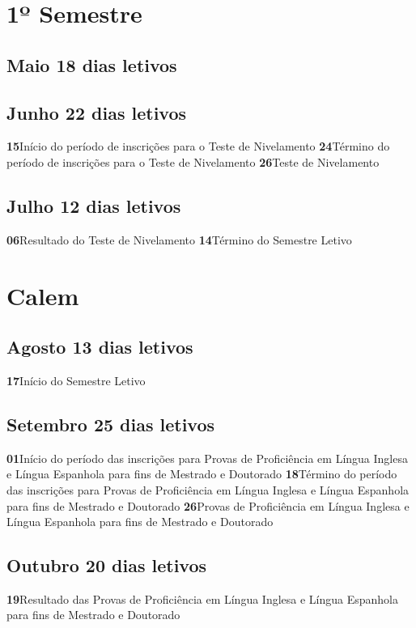 \documentclass[thesis]{hmcposter}
\begin{document}
\begin{poster}
\section{\hfill \color{hmcorange}1º Semestre}
								\subsection{Maio \hfill 18 dias letivos}\subsection{Junho \hfill 22 dias letivos}\textbf{15}\qquad Início do período de inscrições para o Teste de Nivelamento \newline \null\textbf{24}\qquad Término do período de inscrições para o Teste de Nivelamento \newline \null\textbf{26}\qquad Teste de Nivelamento \newline \null\subsection{Julho \hfill 12 dias letivos}\textbf{06}\qquad Resultado do Teste de Nivelamento \newline \null\textbf{14}\qquad Término do Semestre Letivo \newline \null\newpage
\section{\color{hmcorange}Calem}\subsection{Agosto \hfill 13 dias letivos}\textbf{17}\qquad Início do Semestre Letivo \newline \null\subsection{Setembro \hfill 25 dias letivos}\textbf{01}\qquad Início do período das inscrições para Provas de Proficiência em Língua Inglesa e Língua Espanhola para fins de Mestrado e Doutorado \newline \null\textbf{18}\qquad Término do período das inscrições para Provas de Proficiência em Língua Inglesa e Língua Espanhola para fins de Mestrado e Doutorado \newline \null\textbf{26}\qquad Provas de Proficiência em Língua Inglesa e Língua Espanhola para fins de Mestrado e Doutorado \newline \null\subsection{Outubro \hfill 20 dias letivos}\textbf{19}\qquad Resultado das Provas de Proficiência em Língua Inglesa e Língua Espanhola para fins de Mestrado e Doutorado \newline \null\vfill\null
\columnbreak

\end{poster}
\end{document}
